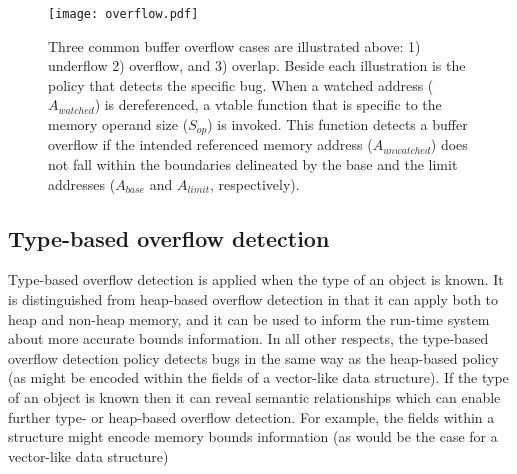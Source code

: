\begin{figure}
\abovedisplayskip=0pt
\belowdisplayskip=0pt
\begin{center}
	\texttt{[image: overflow.pdf]}
\end{center}
\iffalse
	\abovedisplayskip=0pt
	\belowdisplayskip=0pt
	\begin{align*}
		A_{base}  & > {A_{unwatched}} \tag{Underflow} \\
		A_{limit} & \leq {A_{unwatched}} \tag{Overflow} \\
		A_{limit} & < {A_{unwatched}} + S_{op} \tag{Overlap}
	\end{align*}
\fi
\caption[Buffer overflow detection]{\label{fig:detect_overflow}Three common buffer overflow cases are illustrated above: 1) underflow 2) overflow, and 3) overlap. Beside each illustration is the policy that detects the specific bug. When a watched address ($A_{watched}$) is dereferenced, a vtable function that is specific to the memory operand size ($S_{op}$) is invoked. This function detects a buffer overflow if the intended referenced memory address ($A_{unwatched}$) does not fall within the boundaries delineated by the base and the limit addresses ($A_{base}$ and $A_{limit}$, respectively).}
\end{figure}

\subsection{Type-based overflow detection\label{sec:type_overflow}}
Type-based overflow detection is applied when the type of an object is known. It is distinguished from heap-based overflow detection in that it can apply both to heap and non-heap memory, and it can be used to inform the run-time system about more accurate bounds information. In all other respects, the type-based overflow detection policy detects bugs in the same way as the heap-based policy (as might be encoded within the fields of a vector-like data structure). If the type of an object is known then it can reveal semantic relationships which can enable further type- or heap-based overflow detection. For example, the fields within a structure might encode memory bounds information (as would be the case for a vector-like data structure)

